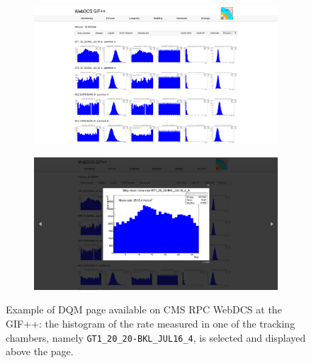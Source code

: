 	\begin{figure}[H]
    	\begin{subfigure}{\linewidth}
			\centering
    		\includegraphics[width = .9\linewidth]{fig/chapt5/GIFpp-DQM-DAQ-fullpage.png}
        	\caption{\label{fig:DQM-DAQ:A}}
    	\end{subfigure}
    	\begin{subfigure}{\linewidth}
			\centering
    		\includegraphics[width = .9\linewidth]{fig/chapt5/GIFpp-DQM-DAQ.png}
        	\caption{\label{fig:DQM-DAQ:B}}
    	\end{subfigure}
		\caption{\label{fig:DQM-DAQ} Example of DQM page available on CMS RPC WebDCS at the GIF++: the histogram of the rate measured in one of the tracking chambers, namely \texttt{GT1\_20\_20-BKL\_JUL16\_4}, is selected and displayed above the page.}
	\end{figure}

